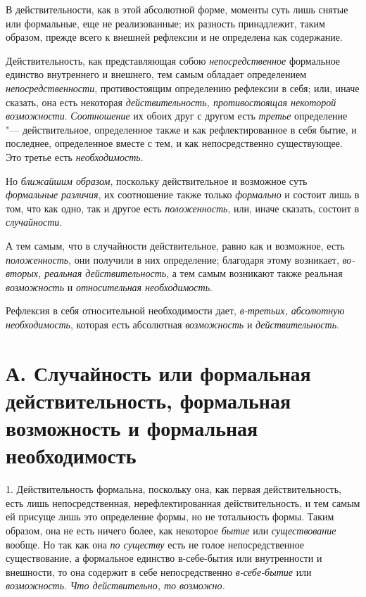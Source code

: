В действительности, как в этой абсолютной форме, моменты суть лишь снятые
или формальные, еще не реализованные; их разность принадлежит, таким
образом, прежде всего к внешней рефлексии и не определена как содержание.

Действительность, как представляющая собою
{\em непосредственное} формальное единство внутреннего
и внешнего, тем самым обладает определением
{\em непосредственности}, противостоящим определению
рефлексии в себя; или, иначе сказать, она есть некоторая
{\em действительность, противостоящая некоторой
возможности}. {\em Соотношение} их обоих друг с другом
есть {\em третье} определение "--- действительное,
определенное также и как рефлектированное в себя бытие, и последнее,
определенное вместе с тем, и как непосредственно существующее. Это третье
есть {\em необходимость}.

Но {\em ближайшим образом}, поскольку действительное и
возможное суть {\em формальные различия}, их
соотношение также только {\em формально} и состоит лишь
в том, что как одно, так и другое есть
{\em положенность}, или, иначе сказать, состоит в {\em случайности}.

А тем самым, что в случайности действительное, равно как и возможное, есть
{\em положенность}, они получили в них определение;
благодаря этому возникает, {\em во-вторых, реальная
действительность}, а тем самым возникают также реальная
{\em возможность} и {\em относительная необходимость}.

Рефлексия в себя относительной необходимости дает,
{\em в-третьих, абсолютную необходимость}, которая есть
абсолютная {\em возможность} и {\em действительность}.


\section[А. Случайность или формальная действительность, формальная возможность и формальная необходимость]%
{А. Случайность или формальная действительность, формальная возможность и формальная необходимость}

1. Действительность формальна, поскольку она,
как первая действительность, есть лишь непосредственная, нерефлектированная
действительность, и тем самым ей присуще лишь это определение формы, но не
тотальность формы. Таким образом, она не есть ничего более, как некоторое
{\em бытие} или {\em существование}
вообще. Но так как она {\em по существу} есть не голое
непосредственное существование, а формальное единство в-себе-бытия или
внутренности и внешности, то она содержит в себе непосредственно
{\em в-себе-бытие} или {\em возможность}. {\em Что действительно, то возможно.}

